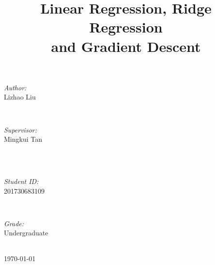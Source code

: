 \documentclass[journal, a4paper]{IEEEtran}
\begin{document}
\begin{titlepage}
\begin{minipage}{0.4\textwidth}
\begin{flushleft} \large
\emph{Author:}\\
Lizhao Liu %
\end{flushleft}
\end{minipage}
~
\begin{minipage}{0.4\textwidth}
\begin{flushright} \large
\emph{Supervisor:} \\
Mingkui Tan %
\end{flushright}
\end{minipage}\\[2cm]
~
\begin{minipage}{0.4\textwidth}
\begin{flushleft} \large
\emph{Student ID:}\\
201730683109
\end{flushleft}
\end{minipage}
~
\begin{minipage}{0.4\textwidth}
\begin{flushright} \large
\emph{Grade:} \\
Undergraduate
\end{flushright}
\end{minipage}\\[2cm]



{\large \today}\\[2cm] %

 

\vfill %

\end{titlepage}

	\title{Linear Regression, Ridge Regression \\and Gradient Descent}
	\maketitle
\end{document}
